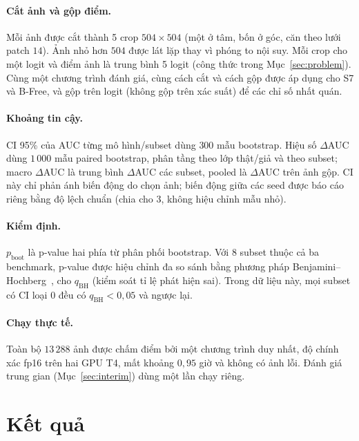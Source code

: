 \documentclass[11pt,a4paper]{article}
\begin{document}
\paragraph{Cắt ảnh và gộp điểm.} Mỗi ảnh được cắt thành 5 crop $504\times504$ (một ở tâm, bốn ở góc, căn theo lưới patch $14$). Ảnh nhỏ hơn $504$ được lát lặp thay vì phóng to nội suy. Mỗi crop cho một logit và điểm ảnh là trung bình 5 logit (công thức trong Mục~\ref{sec:problem}). Cùng một chương trình đánh giá, cùng cách cắt và cách gộp được áp dụng cho S7 và B-Free, và gộp trên logit (không gộp trên xác suất) để các chỉ số nhất quán.

\paragraph{Khoảng tin cậy.} CI 95\% của AUC từng mô hình/subset dùng $300$ mẫu bootstrap. Hiệu số $\Delta$AUC dùng $1\,000$ mẫu paired bootstrap, phân tầng theo lớp thật/giả và theo subset; macro $\Delta$AUC là trung bình $\Delta$AUC các subset, pooled là $\Delta$AUC trên ảnh gộp. CI này chỉ phản ánh biến động do chọn ảnh; biến động giữa các seed được báo cáo riêng bằng độ lệch chuẩn (chia cho $3$, không hiệu chỉnh mẫu nhỏ).

\paragraph{Kiểm định.} $p_{\text{boot}}$ là p-value hai phía từ phân phối bootstrap. Với $8$ subset thuộc cả ba benchmark, p-value được hiệu chỉnh đa so sánh bằng phương pháp Benjamini--Hochberg~\cite{benjamini1995controlling}, cho $q_{\text{BH}}$ (kiểm soát tỉ lệ phát hiện sai). Trong dữ liệu này, mọi subset có CI loại $0$ đều có $q_{\text{BH}}<0{,}05$ và ngược lại.

\paragraph{Chạy thực tế.} Toàn bộ $13\,288$ ảnh được chấm điểm bởi một chương trình duy nhất, độ chính xác fp16 trên hai GPU T4, mất khoảng $0{,}95$ giờ và không có ảnh lỗi. Đánh giá trung gian (Mục~\ref{sec:interim}) dùng một lần chạy riêng.

\section{Kết quả}\label{sec:results}
\end{document}
